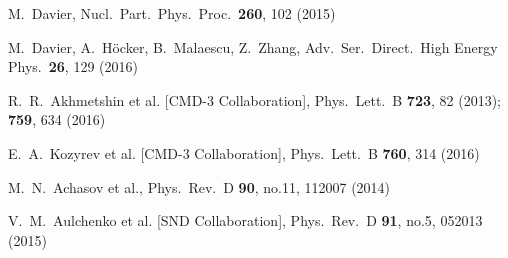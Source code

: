 \documentclass[epj,onecolumn]{webofc}
\begin{document}
\begin{thebibliography}{}
M.~Davier,
Nucl.\ Part.\ Phys.\ Proc.\ {\bf 260}, 102 (2015)

  M.~Davier, A.~H\"ocker, B.~Malaescu, Z.~Zhang,
  Adv.\ Ser.\ Direct.\ High Energy Phys.\  {\bf 26}, 129 (2016)


  R.~R.~Akhmetshin et al. [CMD-3 Collaboration],
  Phys.\ Lett.\ B {\bf 723}, 82 (2013);
%
{\bf 759}, 634 (2016)

  E.~A.~Kozyrev et al. [CMD-3 Collaboration],
  Phys.\ Lett.\ B {\bf 760}, 314 (2016)

  M.~N.~Achasov et al.,
  Phys.\ Rev.\ D {\bf 90}, no.11,  112007 (2014)

  V.~M.~Aulchenko et al. [SND Collaboration],
  Phys.\ Rev.\ D {\bf 91}, no.5,  052013 (2015)


\end{thebibliography}
\end{document}
